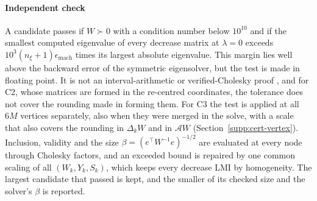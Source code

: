 \paragraph{Independent check}
A candidate passes if $W\succ0$ with a condition number below $10^{10}$ and if the smallest computed eigenvalue of every decrease matrix at $\lambda=0$ exceeds $10^3(n_\xi+1)\epsilon_{\mathrm{mach}}$ times its largest absolute eigenvalue. This margin lies well above the backward error of the symmetric eigensolver, but the test is made in floating point. It is not an interval-arithmetic or verified-Cholesky proof \citep{rump2006verification}, and for C2, whose matrices are formed in the re-centred coordinates, the tolerance does not cover the rounding made in forming them. For C3 the test is applied at all $6M$ vertices separately, also when they were merged in the solve, with a scale that also covers the rounding in $\Delta_kW$ and in $\mathcal AW$ (Section~\ref{supp:cert-vertex}). Inclusion, validity and the size $\beta=(e^\top W^{-1}e)^{-1/2}$ are evaluated at every node through Cholesky factors, and an exceeded bound is repaired by one common scaling of all $(W_k,Y_k,S_k)$, which keeps every decrease LMI by homogeneity. The largest candidate that passed is kept, and the smaller of its checked size and the solver's $\beta$ is reported.


